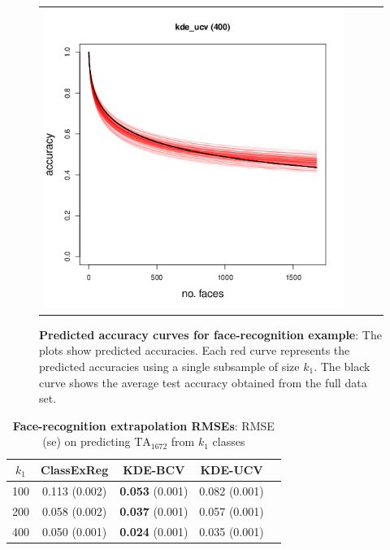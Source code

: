 \documentclass[twoside,11pt]{article}
\begin{document}
\begin{figure}[t]
\begin{tabular}{cccc}
\includegraphics[scale = 0.2, clip = true, trim = 0 0 0 0.6in, valign=c]{repeat_400_kde_ucv.png} \\
\end{tabular}
\caption{\textbf{Predicted accuracy curves for face-recognition example}: The
  plots show predicted accuracies. Each red curve represents the predicted accuracies using
  a single subsample of size $k_1$. The black curve shows the average test accuracy obtained from the full data set. }
\label{fig:lfw_extrapolation2}
\end{figure}

\begin{table}[t]
\centering
\begin{tabular}{c||c|c|c|c}
\hline
$k_1$ & ClassExReg & KDE-BCV & KDE-UCV \\\hline
100 & 0.113 (0.002) & \textbf{0.053} (0.001) & 0.082 (0.001) \\\hline
200 & 0.058 (0.002)& \textbf{0.037} (0.001)  & 0.057 (0.001) \\ \hline
400 & 0.050 (0.001) & \textbf{0.024} (0.001)& 0.035 (0.001) \\\hline
\end{tabular}
\caption{\textbf{Face-recognition extrapolation RMSEs}: RMSE (se) on predicting $\text{TA}_{1672}$ from $k_1$ classes}\label{tab:lfw_accuracy}
\end{table}
\end{document}
